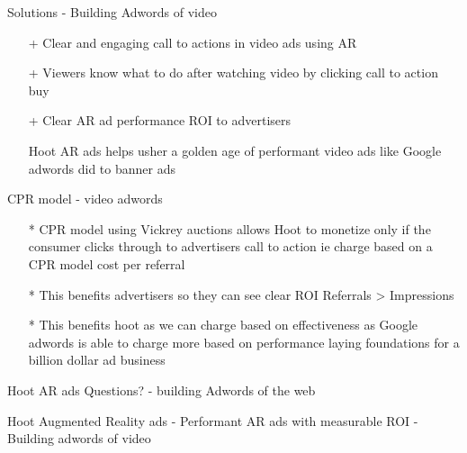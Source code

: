 \documentclass[10pt]{beamer}
\begin{document}
\begin{frame}[fragile]{Solutions - Building Adwords of video}
\begin{itemize}
\item[+]Clear and engaging call to actions in video ads using AR
\item[+]Viewers know what to do after watching video by clicking call to action buy 
\item[+]Clear AR ad performance ROI to advertisers 

Hoot AR ads helps usher a golden age of performant video ads like Google adwords did to banner ads

\end{itemize}


\end{frame}
\begin{frame}[t]{CPR model - video adwords}
\begin{itemize}
\item[*]CPR model using Vickrey auctions allows Hoot to monetize only if the consumer clicks through to advertisers call to action ie charge based on a CPR model cost per referral
\item[*]This benefits advertisers so they can see clear ROI Referrals > Impressions
\item[*]This benefits hoot as we can charge based on effectiveness as Google adwords is able to charge more based on performance laying foundations for a billion dollar ad business
\end{itemize}
\end{frame}
\begin{frame}[standout]
  Hoot AR ads Questions? - building Adwords of the web
  
\end{frame}


\begin{frame}{Hoot Augmented Reality ads - Performant AR ads with  measurable ROI - Building adwords of video}
	
 	
\end{frame}
\end{document}
